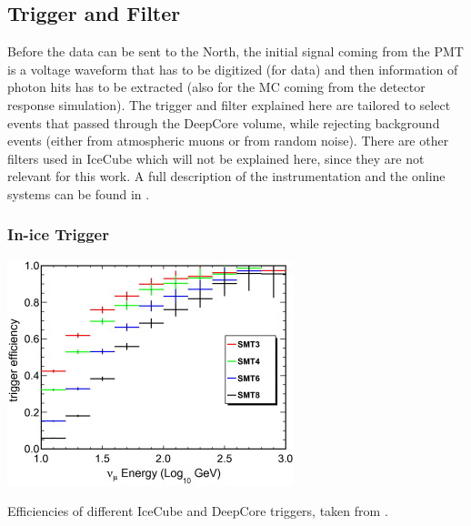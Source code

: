 \subsection{Trigger and Filter} 

Before the data can be sent to the North, the initial signal coming from the PMT is a voltage waveform that has to be digitized (for data) and then information of photon hits has to be extracted (also for the MC coming from the detector response simulation). The trigger and filter explained here are tailored to select events that passed through the DeepCore volume, while rejecting background events (either from atmospheric muons or from random noise). There are other filters used in IceCube which will not be explained here, since they are not relevant for this work. A full description of the instrumentation and the online systems can be found in .


\subsubsection{In-ice Trigger} 


\begin{marginfigure}
    \includegraphics{figures/simulation_and_processing/trigger/trigger_efficiency.jpg}
	\caption[IceCube trigger efficiencies]{Efficiencies of different IceCube and DeepCore triggers, taken from \cite{DeepCore_design_Abbasi2012615}.}
\end{marginfigure}

